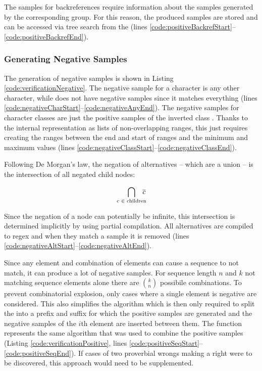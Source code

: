 The samples for backreferences require information about the samples generated by the corresponding group. For this reason, the produced samples are stored and can be accessed via tree search from the  (lines \ref{code:positiveBackrefStart}--\ref{code:positiveBackrefEnd}).

\FloatBarrier
\subsubsection{Generating Negative Samples}

The generation of negative samples is shown in Listing \ref{code:verificationNegative}. The negative sample for a character is any other character, while  does not have negative samples since it matches everything (lines \ref{code:negativeCharStart}--\ref{code:negativeAnyEnd}). The negative samples for character classes are just the positive samples of the inverted class . Thanks to the internal representation as lists of non-overlapping ranges, this just requires creating the ranges between the end and start of ranges and the minimum and maximum values (lines \ref{code:negativeClassStart}--\ref{code:negativeClassEnd}).

Following De Morgan's law, the negation of alternatives -- which are a union -- is the intersection of all negated child nodes:

\vspace{-1em}
\begin{equation*}
    \bigcap_{\text{c } \in \text{ children}} \hspace{-.7em}\overline{c}
\end{equation*}
\vspace{-1em}

Since the negation of a node can potentially be infinite, this intersection is determined implicitly by using partial compilation. All alternatives are compiled to regex and when they match a sample it is removed (lines \ref{code:negativeAltStart}--\ref{code:negativeAltEnd}).

Since any element and combination of elements can cause a sequence to not match, it can produce a lot of negative samples. For sequence length $n$ and $k$ not matching sequence elements alone there are ${k}\choose{n}$ possibile combinations. To prevent combinatorial explosion, only cases where a single element is negative are considered. This also simplifies the algorithm which is then only required to split the  into a prefix and suffix for which the positive samples are generated and the negative samples of the $i$th element are inserted between them. The function  represents the same algorithm that was used to combine the positive samples (Listing \ref{code:verificationPositive}, lines \ref{code:positiveSeqStart}--\ref{code:positiveSeqEnd}). If cases of two proverbial wrongs making a right were to be discovered, this approach would need to be supplemented.

